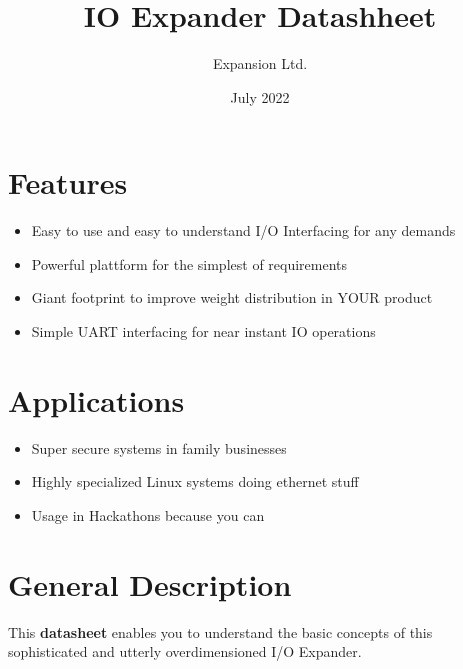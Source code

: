 \documentclass[10pt]{datasheet}
\title{IO Expander Datashheet}
\author{Expansion Ltd.}
\date{July 2022}
\begin{document}
\maketitle

\section{Features}

\begin{itemize}
\item{Easy to use and easy to understand I/O Interfacing for any demands}
\item{Powerful plattform for the simplest of requirements}
\item{Giant footprint to improve weight distribution in YOUR product}
\item{Simple UART interfacing for near instant IO operations}
\end{itemize}

\section{Applications}

\begin{itemize}
\item{Super secure systems in family businesses}
\item{Highly specialized Linux systems doing ethernet stuff}
\item{Usage in Hackathons because you can}
\end{itemize}

\section{General Description}
This \textbf{datasheet} enables you to understand the basic concepts of this sophisticated and utterly overdimensioned I/O Expander.


\vfill\break
\end{document}
